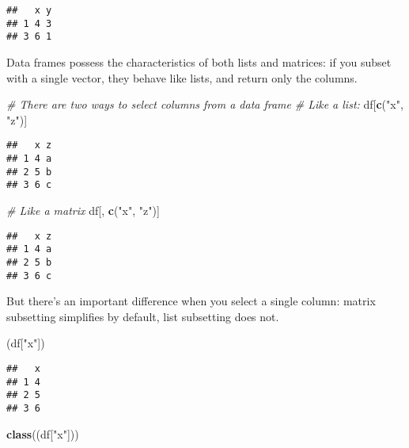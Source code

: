\documentclass[
]{book}
\newenvironment{Shaded}{\begin{snugshade}}{\end{snugshade}}
\newcommand{\CommentTok}[1]{\textcolor[rgb]{0.56,0.35,0.01}{\textit{#1}}}
\newcommand{\KeywordTok}[1]{\textcolor[rgb]{0.13,0.29,0.53}{\textbf{#1}}}
\newcommand{\NormalTok}[1]{#1}
\newcommand{\StringTok}[1]{\textcolor[rgb]{0.31,0.60,0.02}{#1}}
\begin{document}
\begin{verbatim}
##   x y
## 1 4 3
## 3 6 1
\end{verbatim}

Data frames possess the characteristics of both lists and matrices: if you subset with a single vector, they behave like lists, and return only the columns.

\begin{Shaded}
\begin{Highlighting}[]
\CommentTok{\# There are two ways to select columns from a data frame}
\CommentTok{\# Like a list:}
\NormalTok{df[}\KeywordTok{c}\NormalTok{(}\StringTok{"x"}\NormalTok{, }\StringTok{"z"}\NormalTok{)]}
\end{Highlighting}
\end{Shaded}

\begin{verbatim}
##   x z
## 1 4 a
## 2 5 b
## 3 6 c
\end{verbatim}

\begin{Shaded}
\begin{Highlighting}[]
\CommentTok{\# Like a matrix}
\NormalTok{df[, }\KeywordTok{c}\NormalTok{(}\StringTok{"x"}\NormalTok{, }\StringTok{"z"}\NormalTok{)]}
\end{Highlighting}
\end{Shaded}

\begin{verbatim}
##   x z
## 1 4 a
## 2 5 b
## 3 6 c
\end{verbatim}

But there's an important difference when you select a single column: matrix subsetting simplifies by default, list subsetting does not.

\begin{Shaded}
\begin{Highlighting}[]
\NormalTok{(df[}\StringTok{"x"}\NormalTok{])}
\end{Highlighting}
\end{Shaded}

\begin{verbatim}
##   x
## 1 4
## 2 5
## 3 6
\end{verbatim}

\begin{Shaded}
\begin{Highlighting}[]
\KeywordTok{class}\NormalTok{((df[}\StringTok{"x"}\NormalTok{]))}
\end{Highlighting}
\end{Shaded}
\end{document}
